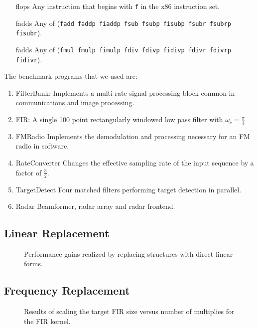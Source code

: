 \begin{itemize}
\item[flops] Any instruction that begins with {\tt f} in the x86 instruction set.
\item[fadds] Any of ({\tt fadd faddp fiaddp fsub fsubp fisubp fsubr fsubrp fisubr}).
\item[fadds] Any of ({\tt fmul fmulp fimulp fdiv fdivp fidivp fdivr fdivrp fidivr}).
\end{itemize}

The benchmark programs that we used are:

\begin{enumerate}
\item FilterBank: Implements a multi-rate signal processing block common in communications and image processing.
\item FIR: A single 100 point rectangularly windowed low pass filter with $\omega_c=\frac{\pi}{3}$
\item FMRadio Implements the demodulation and processing necessary for an FM radio in software.
\item RateConverter Changes the effective sampling rate of the input sequence by a factor of $\frac{3}{2}$.
\item TargetDetect Four matched filters performing target detection in parallel.
\item Radar Beamformer, radar array and radar frontend.
\end{enumerate}


\subsection{Linear Replacement}
\begin{figure}
\center
\epsfxsize=3.0in
\caption{Performance gains realized by replacing structures with direct linear forms.}
\label{fig:combination-graph}
\end{figure}


\subsection{Frequency Replacement}
\begin{figure}
\center
\epsfxsize=3.0in
\caption{Results of scaling the target FIR size versus number of multiplies for the FIR kernel.}
\label{fig:freq-scaling}
\end{figure}

